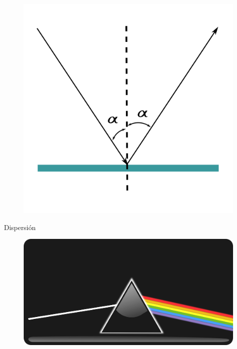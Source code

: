 \documentclass{beamer}
\begin{document}
\begin{frame}
 \begin{figure}
   \centering
   \includegraphics[scale=0.16]{Imagenes/Reflexion_01}
  \end{figure}
\end{frame}

\begin{frame}{Dispersión}
 \begin{figure}
   \centering
   \includegraphics[scale=0.2]{Imagenes/Dispersion_01}
  \end{figure}
\end{frame}
\end{document}
